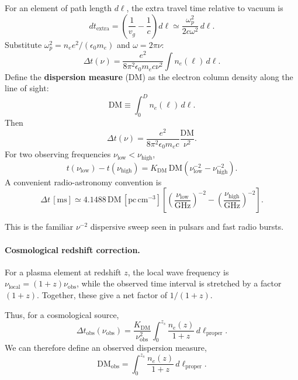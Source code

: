 \documentclass[11pt]{article}
\newcommand{\epsz}{\epsilon_0}
\begin{document}
For an element of path length $d\ell$, the extra travel time relative to vacuum is
\begin{equation}
dt_\mathrm{extra}=\left(\frac{1}{v_g}-\frac{1}{c}\right)d\ell
\simeq\frac{\omega_p^2}{2c\omega^2}\,d\ell.
\end{equation}
Substitute $\omega_p^2=n_e e^2/(\epsz m_e)$ and $\omega=2\pi\nu$:
\begin{equation}
\boxed{\Delta t(\nu)=\frac{e^2}{8\pi^2\epsz m_e c\nu^2}\int n_e(\ell)\,d\ell.}
\end{equation}
Define the \textbf{dispersion measure} (DM) as the electron column density along the line of sight:
\begin{equation}
\boxed{\mathrm{DM}\equiv\int_0^D n_e(\ell)\,d\ell.}
\end{equation}
Then
\begin{equation}
\boxed{\Delta t(\nu)=\frac{e^2}{8\pi^2\epsz m_e c}\frac{\mathrm{DM}}{\nu^2}.}
\end{equation}
For two observing frequencies $\nu_\mathrm{low}<\nu_\mathrm{high}$,
\begin{equation}
\boxed{t(\nu_\mathrm{low})-t(\nu_\mathrm{high})
=K_\mathrm{DM}\,\mathrm{DM}\left(\nu_\mathrm{low}^{-2}-\nu_\mathrm{high}^{-2}\right).}
\end{equation}
A convenient radio-astronomy convention is
\begin{equation}
\boxed{\Delta t\,[\mathrm{ms}]\simeq4.1488\,\mathrm{DM}\,[\mathrm{pc\,cm^{-3}}]
\left[\left(\frac{\nu_\mathrm{low}}{\mathrm{GHz}}\right)^{-2}
-\left(\frac{\nu_\mathrm{high}}{\mathrm{GHz}}\right)^{-2}\right].}
\end{equation}

This is the familiar $\nu^{-2}$ dispersive sweep seen in pulsars and fast radio bursts.

\paragraph{Cosmological redshift correction.}
For a plasma element at redshift $z$, the local wave frequency is
$\nu_\mathrm{local}=(1+z)\nu_\mathrm{obs}$, while the observed time interval
is stretched by a factor $(1+z)$. Together, these give a net factor
of $1/(1+z)$.

Thus, for a cosmological source,
\begin{equation}
\boxed{
\Delta t_\mathrm{obs}(\nu_\mathrm{obs})
=\frac{K_\mathrm{DM}}{\nu_\mathrm{obs}^2}
\int_0^{z_s}\frac{n_e(z)}{1+z}\,d\ell_\mathrm{proper}.
}
\end{equation}
We can therefore define an observed dispersion measure,
\begin{equation}
\boxed{
\mathrm{DM}_\mathrm{obs}
=\int_0^{z_s}\frac{n_e(z)}{1+z}\,d\ell_\mathrm{proper}.
}
\end{equation}
\end{document}
